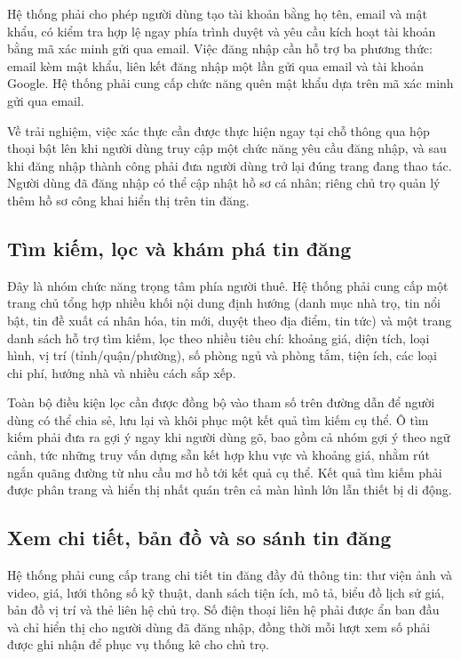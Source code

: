 Hệ thống phải cho phép người dùng tạo tài khoản bằng họ tên, email và mật khẩu, có kiểm tra hợp lệ ngay phía trình duyệt và yêu cầu kích hoạt tài khoản bằng mã xác minh gửi qua email. Việc đăng nhập cần hỗ trợ ba phương thức: email kèm mật khẩu, liên kết đăng nhập một lần gửi qua email và tài khoản Google. Hệ thống phải cung cấp chức năng quên mật khẩu dựa trên mã xác minh gửi qua email.

Về trải nghiệm, việc xác thực cần được thực hiện ngay tại chỗ thông qua hộp thoại bật lên khi người dùng truy cập một chức năng yêu cầu đăng nhập, và sau khi đăng nhập thành công phải đưa người dùng trở lại đúng trang đang thao tác. Người dùng đã đăng nhập có thể cập nhật hồ sơ cá nhân; riêng chủ trọ quản lý thêm hồ sơ công khai hiển thị trên tin đăng.

\FloatBarrier
\subsection{Tìm kiếm, lọc và khám phá tin đăng}

Đây là nhóm chức năng trọng tâm phía người thuê. Hệ thống phải cung cấp một trang chủ tổng hợp nhiều khối nội dung định hướng (danh mục nhà trọ, tin nổi bật, tin đề xuất cá nhân hóa, tin mới, duyệt theo địa điểm, tin tức) và một trang danh sách hỗ trợ tìm kiếm, lọc theo nhiều tiêu chí: khoảng giá, diện tích, loại hình, vị trí (tỉnh/quận/phường), số phòng ngủ và phòng tắm, tiện ích, các loại chi phí, hướng nhà và nhiều cách sắp xếp.

Toàn bộ điều kiện lọc cần được đồng bộ vào tham số trên đường dẫn để người dùng có thể chia sẻ, lưu lại và khôi phục một kết quả tìm kiếm cụ thể. Ô tìm kiếm phải đưa ra gợi ý ngay khi người dùng gõ, bao gồm cả nhóm gợi ý theo ngữ cảnh, tức những truy vấn dựng sẵn kết hợp khu vực và khoảng giá, nhằm rút ngắn quãng đường từ nhu cầu mơ hồ tới kết quả cụ thể. Kết quả tìm kiếm phải được phân trang và hiển thị nhất quán trên cả màn hình lớn lẫn thiết bị di động.

\FloatBarrier
\subsection{Xem chi tiết, bản đồ và so sánh tin đăng}

Hệ thống phải cung cấp trang chi tiết tin đăng đầy đủ thông tin: thư viện ảnh và video, giá, lưới thông số kỹ thuật, danh sách tiện ích, mô tả, biểu đồ lịch sử giá, bản đồ vị trí và thẻ liên hệ chủ trọ. Số điện thoại liên hệ phải được ẩn ban đầu và chỉ hiển thị cho người dùng đã đăng nhập, đồng thời mỗi lượt xem số phải được ghi nhận để phục vụ thống kê cho chủ trọ.

